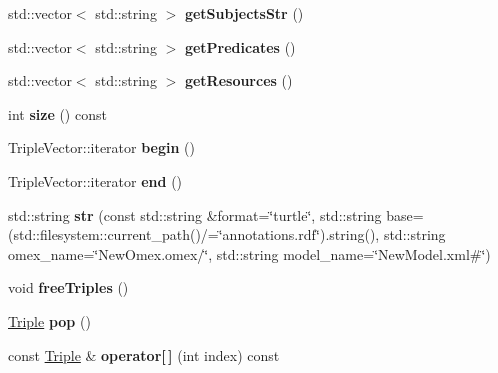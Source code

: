 \begin{DoxyCompactItemize}
std\+::vector$<$ std\+::string $>$ {\bfseries get\+Subjects\+Str} ()
\item 
\mbox{\label{classomexmeta_1_1Triples_a63639c08caac19e6c5cbf30bb28292d0}} 
std\+::vector$<$ std\+::string $>$ {\bfseries get\+Predicates} ()
\item 
\mbox{\label{classomexmeta_1_1Triples_aa875120a73cb1618be9e699e8bfb08c4}} 
std\+::vector$<$ std\+::string $>$ {\bfseries get\+Resources} ()
\item 
\mbox{\label{classomexmeta_1_1Triples_adc86427b3563d04849336a8da7566451}} 
int {\bfseries size} () const
\item 
\mbox{\label{classomexmeta_1_1Triples_aa6735eb506ff0d5a3179fab3af3b2602}} 
Triple\+Vector\+::iterator {\bfseries begin} ()
\item 
\mbox{\label{classomexmeta_1_1Triples_a4312337b242280bcb119908c0334bfd8}} 
Triple\+Vector\+::iterator {\bfseries end} ()
\item 
\mbox{\label{classomexmeta_1_1Triples_ad2510c5b335b0266b05507c53bcc64af}} 
std\+::string {\bfseries str} (const std\+::string \&format=\char`\"{}turtle\char`\"{}, std\+::string base=(std\+::filesystem\+::current\+\_\+path()/=\char`\"{}annotations.\+rdf\char`\"{}).string(), std\+::string omex\+\_\+name=\char`\"{}New\+Omex.\+omex/\char`\"{}, std\+::string model\+\_\+name=\char`\"{}New\+Model.\+xml\#\char`\"{})
\item 
\mbox{\label{classomexmeta_1_1Triples_ad0c5839b0f49d6427cf53004baf9b0f4}} 
void {\bfseries free\+Triples} ()
\item 
\mbox{\label{classomexmeta_1_1Triples_a5dad8f2cde0a3f6c0ce341338f80b0cd}} 
\hyperlink{classomexmeta_1_1Triple}{Triple} {\bfseries pop} ()
\item 
\mbox{\label{classomexmeta_1_1Triples_a43d540423a436986d9f72d7cf0f02d72}} 
const \hyperlink{classomexmeta_1_1Triple}{Triple} \& {\bfseries operator\mbox{[}$\,$\mbox{]}} (int index) const

\end{DoxyCompactItemize}
